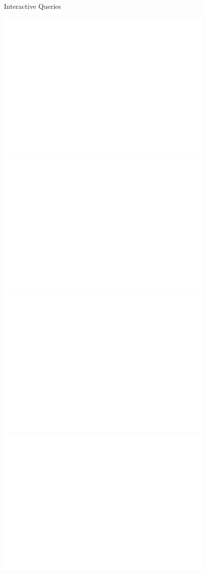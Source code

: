 \documentclass{beamer}
\begin{document}
\begin{frame}{Interactive Queries}
\begin{overprint}
 \includegraphics[width=0.8\textwidth]{allq1}
 \includegraphics[width=0.8\textwidth]{allq2}
 \includegraphics[width=0.8\textwidth]{allq3}
 \includegraphics[width=0.8\textwidth]{allq4}
\end{overprint}
\end{frame}
\end{document}

